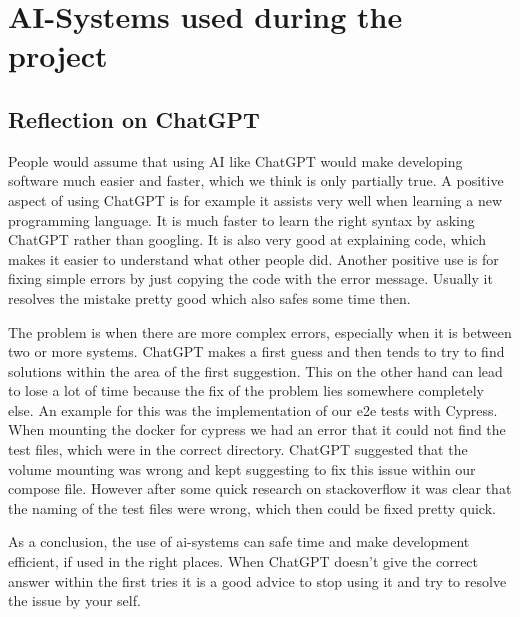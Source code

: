 \section{AI-Systems used during the project}
\subsection{Reflection on ChatGPT}

People would assume that using AI like ChatGPT would make developing software much easier and faster, which we think is only partially true. 
A positive aspect of using ChatGPT is for example it assists very well when learning a new programming language. It is much faster to learn the right syntax 
by asking ChatGPT rather than googling. It is also very good at explaining code, which makes it easier to understand what other people did. 
Another positive use is for fixing simple errors by just copying the code with the error message. Usually it resolves the mistake pretty good which also safes some time then.\

The problem is when there are more complex errors, especially when it is between two or more systems. ChatGPT makes a first guess and then tends to try to find solutions within
the area of the first suggestion. This on the other hand can lead to lose a lot of time because the fix of the problem lies somewhere completely else. 
An example for this was the implementation of our e2e tests with Cypress. When mounting the docker for cypress we had an error that it could not find the test files, 
which were in the correct directory. ChatGPT suggested that the volume mounting was wrong and kept suggesting to fix this issue within our compose file. 
However after some quick research on stackoverflow it was clear that the naming of the test files were wrong, which then could be fixed pretty quick.\

As a conclusion, the use of ai-systems can safe time and make development efficient, if used in the right places. When ChatGPT doesn't give the correct answer within 
the first tries it is a good advice to stop using it and try to resolve the issue by your self. 